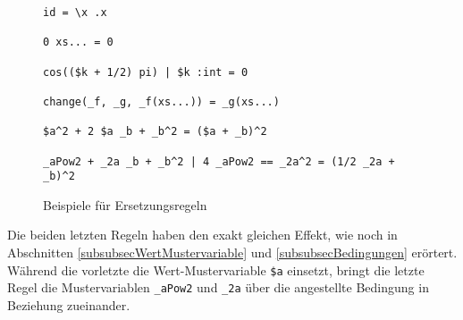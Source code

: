 \begin{figure}
\begin{verbatim}
id = \x .x

0 xs... = 0

cos(($k + 1/2) pi) | $k :int = 0

change(_f, _g, _f(xs...)) = _g(xs...)

$a^2 + 2 $a _b + _b^2 = ($a + _b)^2

_aPow2 + _2a _b + _b^2 | 4 _aPow2 == _2a^2 = (1/2 _2a + _b)^2
\end{verbatim}
\label{figBspRegeln}
\caption{Beispiele für Ersetzungsregeln}
\end{figure}
Die beiden letzten Regeln haben den exakt gleichen Effekt, wie noch in Abschnitten \ref{subsubsecWertMustervariable} und \ref{subsubsecBedingungen} erörtert. Während die vorletzte die Wert-Mustervariable \verb|$a| einsetzt, bringt die letzte Regel die Mustervariablen \verb|_aPow2| und \verb|_2a| über die angestellte Bedingung in Beziehung zueinander.



